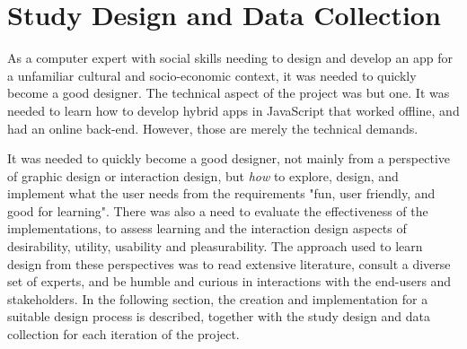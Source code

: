 \section{Study Design and Data Collection}

  As a computer expert with social skills needing to design and develop an app for a unfamiliar cultural and socio-economic context, it was needed to quickly become a good designer. The technical aspect of the project was but one. It was needed to learn how to develop hybrid apps in JavaScript that worked offline, and had an online back-end. However, those are merely the technical demands.

  It was needed to quickly become a good designer, not mainly from a perspective of graphic design or interaction design, but \textit{how} to explore, design, and implement what the user needs from the requirements "fun, user friendly, and good for learning". There was also a need to evaluate the effectiveness of the implementations, to assess learning and the interaction design aspects of desirability, utility, usability and pleasurability. The approach used to learn design from these perspectives was to read extensive literature, consult a diverse set of experts, and be humble and curious in interactions with the end-users and stakeholders. In the following section, the creation and implementation for a suitable design process is described, together with the study design and data collection for each iteration of the project.



%








